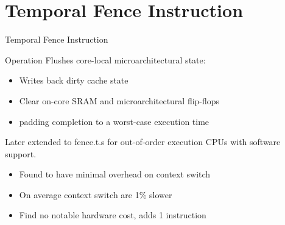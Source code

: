\section{Temporal Fence Instruction}

\begin{frame}{Temporal Fence Instruction}
	\begin{block}{Operation}
		Flushes core-local microarchitectural state:
		\begin{itemize}
      \item Writes back dirty cache state
      \item Clear on-core SRAM and microarchitectural flip-flops
      \item padding completion to a worst-case execution time 
		\end{itemize}

    Later extended to fence.t.s for out-of-order execution CPUs with software support.
	\end{block}

  \begin{itemize}
  \item Found to have minimal overhead on context switch
  \item On average context switch are 1\% slower
  \item Find no notable hardware cost, adds 1 instruction
  \end{itemize}
\end{frame}
